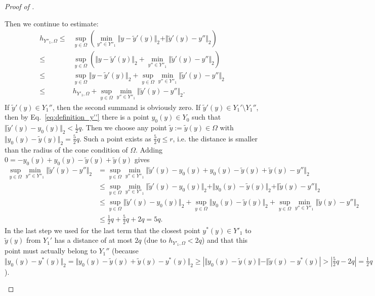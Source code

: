 \documentclass[a4paper, 10pt]{article}
\begin{document}
\begin{proof}[Proof of ]
\begin{itemize}
Then we continue to estimate:
\begin{align*}
h_{Y''_1, \Omega} \leq& \sup_{y \in \Omega} \left( \min_{y'' \in Y''_1} \Vert y - \tilde{y}'(y) \Vert_2 + \Vert \tilde{y}'(y) - y'' \Vert_2 \right) \\
\leq& \sup_{y \in \Omega} \left( \Vert y - \tilde{y}'(y) \Vert_2 + \min_{y'' \in Y''_1}  \Vert \tilde{y}'(y) - y'' \Vert_2 \right) \\
\leq& \sup_{y \in \Omega} \Vert y - \tilde{y}'(y) \Vert_2 + \sup_{y \in \Omega} \min_{y'' \in Y''_1}  \Vert \tilde{y}'(y) - y'' \Vert_2 \\
\leq& h_{Y'_1, \Omega} + \sup_{y \in \Omega} \min_{y'' \in Y''_1}  \Vert \tilde{y}'(y) - y'' \Vert_2.
%
%
%
%
%
%
\end{align*}
If $\tilde{y}'(y) \in Y_1''$, then the second summand is obviously zero.
If $\tilde{y}'(y) \in Y_1' \setminus Y_1''$, then by Eq.\ \eqref{eq:definition_y''} there is a point $y_0(y) \in Y_0$ such that $\Vert \tilde{y}'(y) - y_0(y) \Vert_2 < \frac{1}{2} q$. 
Then we choose any point $\tilde{y} := \tilde{y}(y) \in \Omega$ with $\Vert y_0(y) - \tilde{y}(y) \Vert_2 = \frac{5}{2} q$.
Such a point exists as $\frac{5}{2} q \leq r$, i.e. the distance is smaller than the radius of the cone condition of $\Omega$.
Adding $0 = - y_0(y) + y_0(y) - \tilde{y}(y) + \tilde{y}(y)$ gives
\begin{align*}
\sup_{y \in \Omega} \min_{y'' \in Y''_1}  \Vert \tilde{y}'(y) - y'' \Vert_2 
&= \sup_{y \in \Omega} \min_{y'' \in Y''_1}  \Vert \tilde{y}'(y) - y_0(y) + y_0(y) - \tilde{y}(y) + \tilde{y}(y) - y'' \Vert_2 \\
&\leq \sup_{y \in \Omega} \min_{y'' \in Y''_1}  \Vert \tilde{y}'(y) - y_0(y) \Vert_2 + \Vert y_0(y) - \tilde{y}(y) \Vert_2+ \Vert \tilde{y}(y) - y'' \Vert_2 \\
&\leq \sup_{y \in \Omega} \Vert \tilde{y}'(y) - y_0(y) \Vert_2 + \sup_{y \in \Omega} \Vert y_0(y) - \tilde{y}(y) \Vert_2 + \sup_{y \in \Omega} \min_{y'' \in Y''_1} \Vert \tilde{y}(y) - y'' \Vert_2 \\
&\leq \frac{1}{2} q + \frac{5}{2} q + 2q = 5q.
\end{align*}
In the last step we used for the last term that the closest point $y^*(y) \in Y'_1$ to $\tilde{y}(y)$ from $Y_1'$ has a distance of at most $2q$ (due to $h_{Y'_1, \Omega} < 2q$) and that this point must actually belong to $Y_1''$ (because $\Vert y_0(y) - y^*(y) \Vert_2 = \Vert y_0(y) - \tilde{y}(y) + \tilde{y}(y) - y^*(y) \Vert_2 \geq \left| \Vert y_0(y) - \tilde{y}(y) \Vert - \Vert \tilde{y}(y) - y^*(y) \right| > |\frac{5}{2} q - 2q | = \frac{1}{2} q$). \\

\end{itemize}
\end{proof}
\end{document}
